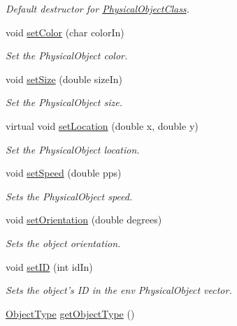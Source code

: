 \begin{DoxyCompactItemize}
\begin{DoxyCompactList}\small\item\em Default destructor for \hyperlink{classPhysicalObjectClass}{Physical\-Object\-Class}. \end{DoxyCompactList}\item 
void \hyperlink{classPhysicalObjectClass_aed8b6e0511dd981e8161eabfc6705be1}{set\-Color} (char color\-In)
\begin{DoxyCompactList}\small\item\em Set the Physical\-Object color. \end{DoxyCompactList}\item 
void \hyperlink{classPhysicalObjectClass_a46784b1ccea116af39de1bdccf64328a}{set\-Size} (double size\-In)
\begin{DoxyCompactList}\small\item\em Set the Physical\-Object size. \end{DoxyCompactList}\item 
virtual void \hyperlink{classPhysicalObjectClass_a3f9833aa04aa438de63b82fc761910ba}{set\-Location} (double x, double y)
\begin{DoxyCompactList}\small\item\em Set the Physical\-Object location. \end{DoxyCompactList}\item 
void \hyperlink{classPhysicalObjectClass_ab8315565f193dd26f7069480d820a7c9}{set\-Speed} (double pps)
\begin{DoxyCompactList}\small\item\em Sets the Physical\-Object speed. \end{DoxyCompactList}\item 
void \hyperlink{classPhysicalObjectClass_a27ee3beb6442bcccced77ce20bee7b4c}{set\-Orientation} (double degrees)
\begin{DoxyCompactList}\small\item\em Sets the object orientation. \end{DoxyCompactList}\item 
void \hyperlink{classPhysicalObjectClass_a24a8cd79d7edfdd4e77518f8710560f5}{set\-I\-D} (int id\-In)
\begin{DoxyCompactList}\small\item\em Sets the object's I\-D in the env Physical\-Object vector. \end{DoxyCompactList}\item 
\hyperlink{PhysicalObjectClass_8h_a842c5e2e69277690b064bf363c017980}{Object\-Type} \hyperlink{classPhysicalObjectClass_a22607bc441c1f2eb12ac515dfcae7727}{get\-Object\-Type} ()

\end{DoxyCompactItemize}
